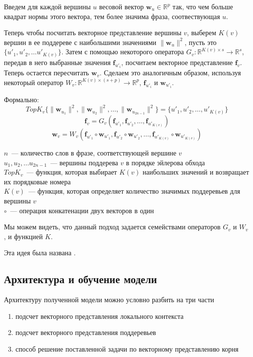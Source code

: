 Введем для каждой вершины $u$ весовой вектор $\pmb{w}_u \in \mathbb{R}^p$  так, что
чем больше квадрат нормы  этого вектора, тем более значима фраза, соотвествующая $u$.

Теперь чтобы посчитать векторное представление вершины $v$, выберем $K(v)$ вершин
в ее поддереве с наибольшими значениями $\lVert \pmb{w}_u \rVert^2$, пусть это $\{ u'_1, u'_2, \dots u'_{K(v)} \}$.
Затем с помощью некоторого оператора $G_v:\mathbb{R}^{K(v) \times s} \to \mathbb{R}^s$, 
передав в него выбранные значения $\pmb{f}_{u'_i}$, посчитаем векторное представление $\pmb{f}_v$.
Теперь остается пересчитать $\pmb{w}_v$. Сделаем это аналогичным образом, используя некоторый оператор 
$W_v :\mathbb{R}^{K(v) \times (s + p)} \to \mathbb{R}^p$, $\pmb{f}_{u'_i}$ и $\pmb{w}_{u'_i}$.

Формально:
$$TopK_v \{ \lVert \pmb{w}_{u_1} \rVert^2, \lVert \pmb{w}_{u_2} \rVert^2, \dots, \lVert \pmb{w}_{u_{2n-1}} \rVert^2\} = \{u'_1, u'_2, \dots, u'_{K(v)}\}$$
$$\pmb{f}_v = G_v(\pmb{f}_{u'_1}, \pmb{f}_{u'_2}, \dots, \pmb{f}_{u'_{K(v)}})$$
$$\pmb{w}_v = W_v(\pmb{f}_{u'_1} \circ \pmb{w}_{u'_1},\pmb{f}_{u'_2} \circ \pmb{w}_{u'_2}, \dots, \pmb{f}_{u'_{K(v)}} \circ \pmb{w}_{u'_{K(v)}})$$

\noindent $n$~--- количество слов в фразе, соответствующей вершине $v$\\
$u_1, u_2, \dots u_{2n-1}$~--- вершины поддерева $v$ в порядке эйлерова обхода\\
$TopK_v$~--- функция, которая выбирает $K(v)$ наибольших значений и возвращает их порядковые номера\\
$K(v)$~--- функция, которая определяет количество значимых поддеревьев для вершины $v$\\
$\circ$~--- операция конкатенации двух векторов в один

Мы можем видеть, что данный подход задается семействами операторов $G_v$ и $W_v$, и функцией $K$.


\noindent Эта идея была названа .

\subsection{Архитектура и обучение модели}

Архитектуру полученной модели можно условно разбить на три части
\begin{enumerate}
    \item{подсчет векторного представления локального контекста}
    \item{подсчет векторного представления поддеревьев}
    \item{способ решение поставленной задачи по векторному представлению корня}
\end{enumerate}

